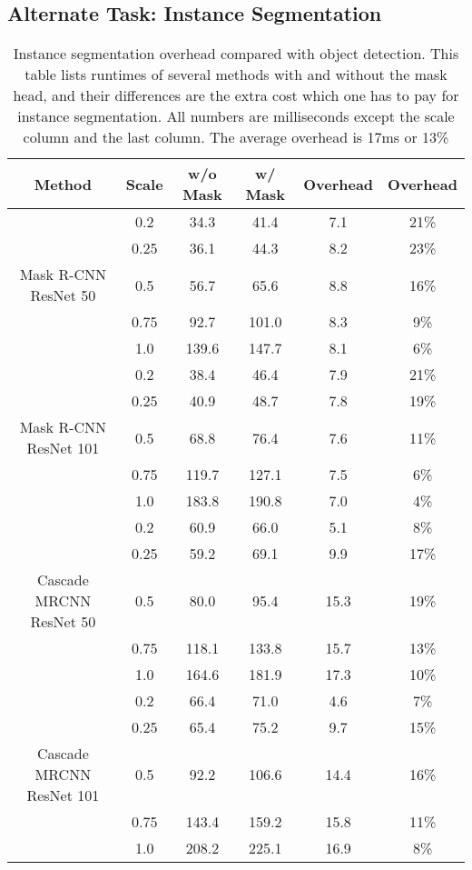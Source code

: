 \subsection{Alternate Task: Instance Segmentation}
\label{app:instseg}

\begin{table*}[]
\small
\centering
\caption{Instance segmentation overhead compared with object detection. This table lists runtimes of several methods with and without the mask head, and their differences are the extra cost which one has to pay for instance segmentation. All numbers are milliseconds except the scale column and the last column. The average overhead is 17ms or 13\%}
\label{tab:mask-overhead}
\addtolength{\tabcolsep}{0.22em}
\begin{tabular}{cccccc}
\toprule
Method & Scale & w/o Mask & w/ Mask & Overhead & Overhead \\
\midrule
 & 0.2 & 34.3 & 41.4 & 7.1 & 21\% \\
 & 0.25 & 36.1 & 44.3 & 8.2 & 23\% \\
Mask R-CNN ResNet 50 & 0.5 & 56.7 & 65.6 & 8.8 & 16\% \\
 & 0.75 & 92.7 & 101.0 & 8.3 & 9\% \\
 & 1.0 & 139.6 & 147.7 & 8.1 & 6\% \\
\midrule
 & 0.2 & 38.4 & 46.4 & 7.9 & 21\% \\
 & 0.25 & 40.9 & 48.7 & 7.8 & 19\% \\
Mask R-CNN ResNet 101 & 0.5 & 68.8 & 76.4 & 7.6 & 11\% \\
 & 0.75 & 119.7 & 127.1 & 7.5 & 6\% \\
 & 1.0 & 183.8 & 190.8 & 7.0 & 4\% \\
\midrule
 & 0.2 & 60.9 & 66.0 & 5.1 & 8\% \\
 & 0.25 & 59.2 & 69.1 & 9.9 & 17\% \\
Cascade MRCNN ResNet 50 & 0.5 & 80.0 & 95.4 & 15.3 & 19\% \\
 & 0.75 & 118.1 & 133.8 & 15.7 & 13\% \\
 & 1.0 & 164.6 & 181.9 & 17.3 & 10\% \\
\midrule
 & 0.2 & 66.4 & 71.0 & 4.6 & 7\% \\
 & 0.25 & 65.4 & 75.2 & 9.7 & 15\% \\
Cascade MRCNN ResNet 101 & 0.5 & 92.2 & 106.6 & 14.4 & 16\% \\
 & 0.75 & 143.4 & 159.2 & 15.8 & 11\% \\
 & 1.0 & 208.2 & 225.1 & 16.9 & 8\% \\
\bottomrule
\end{tabular}
\addtolength{\tabcolsep}{-0.22em}
\end{table*}

